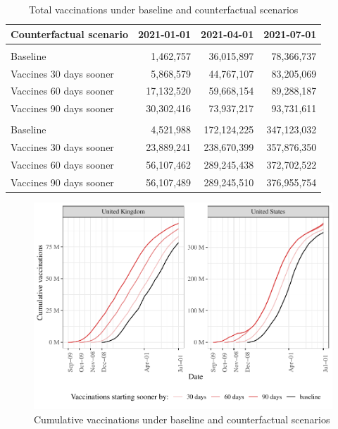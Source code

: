 \documentclass{article}
\begin{document}
\begin{table}

\caption{\label{tab:vaccinations-table}Total vaccinations under baseline and counterfactual scenarios}
\centering
\begin{tabular}[t]{lrrr}
\toprule
Counterfactual scenario & 2021-01-01 & 2021-04-01 & 2021-07-01\\
\midrule
\addlinespace[0.3em]
\multicolumn{4}{l}{\textbf{United Kingdom}}\\
\hspace{1em}Baseline & 1,462,757 & 36,015,897 & 78,366,737\\
\hspace{1em}Vaccines 30 days sooner & 5,868,579 & 44,767,107 & 83,205,069\\
\hspace{1em}Vaccines 60 days sooner & 17,132,520 & 59,668,154 & 89,288,187\\
\hspace{1em}Vaccines 90 days sooner & 30,302,416 & 73,937,217 & 93,731,611\\
\addlinespace[0.3em]
\multicolumn{4}{l}{\textbf{United States}}\\
\hspace{1em}Baseline & 4,521,988 & 172,124,225 & 347,123,032\\
\hspace{1em}Vaccines 30 days sooner & 23,889,241 & 238,670,399 & 357,876,350\\
\hspace{1em}Vaccines 60 days sooner & 56,107,462 & 289,245,438 & 372,702,522\\
\hspace{1em}Vaccines 90 days sooner & 56,107,489 & 289,245,510 & 376,955,754\\
\bottomrule
\end{tabular}
\end{table}

\begin{figure}[H]

{\centering \includegraphics[height=0.4\textheight,]{_main_files/figure-latex/cumul-vacc-cfacts-1}

}

\caption{Cumulative vaccinations under baseline and counterfactual scenarios}\label{fig:cumul-vacc-cfacts}
\end{figure}
\end{document}
